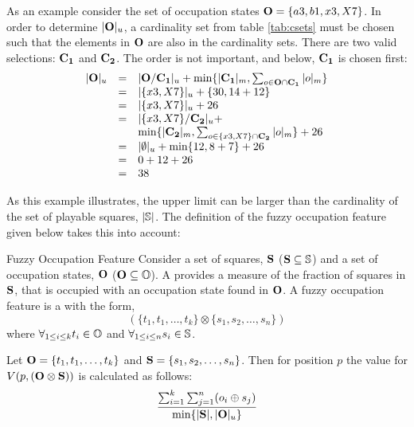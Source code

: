 As an example consider the set of occupation states ${\bf O} = \{a3,b1,x3,X7\}$.  In order to determine $|{\bf O}|_u$, a cardinality set from table \ref{tab:csets} must be chosen such that the elements in ${\bf O}$ are also in the cardinality sets.  There are two valid selections: ${\bf C_1}$ and ${\bf C_2}$.  The order is not important, and below, ${\bf C_1}$ is chosen first:
\[
\begin{array}{lcl}
|{\bf O}|_u &=& 
       |{\bf O} / {\bf C_1}|_u + \mbox{min} \{|{\bf C_1}|_m, \sum_{o \in {\bf O} \cap {\bf C_1}} |o|_m \} \\
 &=&  |\{x3,X7\}|_u  + \mbox \{30,14+12\} \\
 &=&  |\{x3,X7\}|_u  + 26 \\
 &=& |\{x3,X7\} / {\bf C_2}|_u  + \\
 && \mbox{min} \{|{\bf C_2}|_m, \sum_{o \in \{x3,X7\} \cap {\bf C_2}} |o|_m \} + 26 \\
 & = & |\emptyset|_u + \mbox{min} \{12, 8 + 7 \} + 26 \\
 & = & 0 + 12 + 26 \\
 & = & 38 \\
 \end{array}
\]

As this example illustrates, the upper limit can be larger than the cardinality of the set of playable squares, $|\mathbb{S}|$.  The definition of the fuzzy occupation feature given below takes this into account:

\begin{definition}{Fuzzy Occupation Feature}
Consider a set of squares, ${\bf S}$ ($ {\bf S} \subseteq \mathbb{S}$)  and a set of occupation states, ${\bf O}$ ($ {\bf O} \subseteq \mathbb{O}$).  A  provides a measure of the fraction of squares in ${\bf S}$, that is occupied with an occupation state found in ${\bf O}$.  A fuzzy occupation feature is a \mywff{} with the form,
\[
(\{t_1,t_1, \ldots ,t_k \} \otimes \{s_1,s_2, \ldots, s_n\})
\]
where $\forall_{1 \leq i \leq k} t_i \in \mathbb{O}$  
and  $\forall_{1 \leq i \leq n}  s_i \in \mathbb{S}$.

Let ${\bf O} =  \{t_1, t_1, \ldots ,t_k \}$ and ${\bf S} = \{s_1,s_2, \ldots, s_n\}$. Then for position $p$ the value for $V(p,({\bf O} \otimes {\bf S}))$  is calculated as follows:
\[
\frac { \sum_{i=1}^{k} \sum_{j=1}^{n} ( o_i \oplus s_j ) } 
{\mbox{min}\{|{\bf S}|,|{\bf O}|_u\}}
\]
\end{definition}

